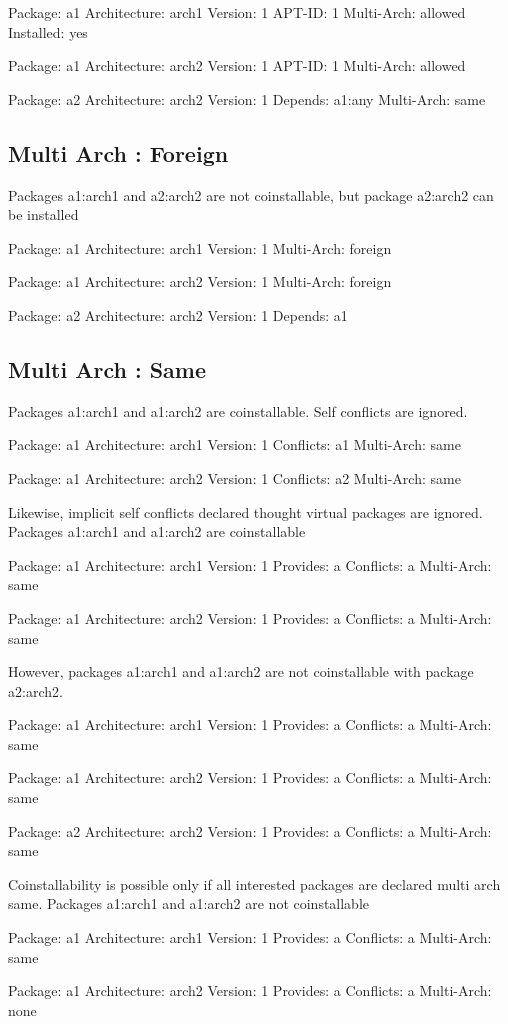 Package: a1
Architecture: arch1
Version: 1
APT-ID: 1
Multi-Arch: allowed
Installed: yes

Package: a1
Architecture: arch2
Version: 1
APT-ID: 1
Multi-Arch: allowed

Package: a2
Architecture: arch2
Version: 1
Depends: a1:any
Multi-Arch: same

\subsection{Multi Arch : Foreign}

Packages a1:arch1 and a2:arch2 are not coinstallable, but package
a2:arch2 can be installed 

Package: a1
Architecture: arch1
Version: 1
Multi-Arch: foreign

Package: a1
Architecture: arch2
Version: 1
Multi-Arch: foreign

Package: a2
Architecture: arch2
Version: 1
Depends: a1

\subsection{Multi Arch : Same}

Packages a1:arch1 and a1:arch2 are coinstallable. Self conflicts are
ignored.

Package: a1
Architecture: arch1
Version: 1
Conflicts: a1
Multi-Arch: same

Package: a1
Architecture: arch2
Version: 1
Conflicts: a2
Multi-Arch: same

Likewise, implicit self conflicts declared thought virtual packages are
ignored. Packages a1:arch1 and a1:arch2 are coinstallable

Package: a1
Architecture: arch1
Version: 1
Provides: a
Conflicts: a
Multi-Arch: same

Package: a1
Architecture: arch2
Version: 1
Provides: a
Conflicts: a
Multi-Arch: same

However, packages a1:arch1 and a1:arch2 are not coinstallable with package
a2:arch2. 

Package: a1
Architecture: arch1
Version: 1
Provides: a
Conflicts: a
Multi-Arch: same

Package: a1
Architecture: arch2
Version: 1
Provides: a
Conflicts: a
Multi-Arch: same

Package: a2
Architecture: arch2
Version: 1
Provides: a
Conflicts: a
Multi-Arch: same

Coinstallability is possible only if all interested packages are declared multi arch same.
Packages a1:arch1 and a1:arch2 are not coinstallable

Package: a1
Architecture: arch1
Version: 1
Provides: a
Conflicts: a
Multi-Arch: same

Package: a1
Architecture: arch2
Version: 1
Provides: a
Conflicts: a
Multi-Arch: none
